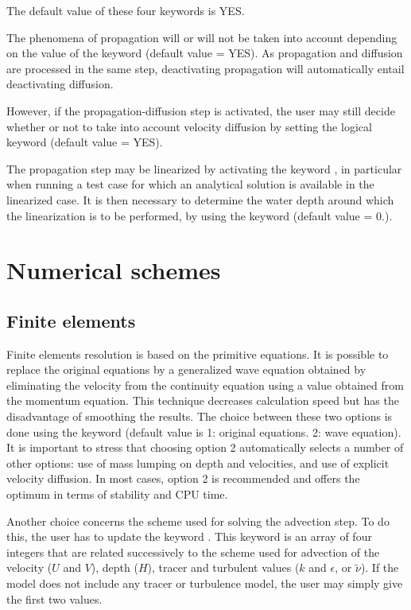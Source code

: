 The default value of these four keywords is YES.

The phenomena of propagation will or will not be taken into account depending
on the value of the keyword  (default value = YES).
As propagation and diffusion are processed in the same step,
deactivating propagation will automatically entail deactivating diffusion.

However, if the propagation-diffusion step is activated, the user may still
decide whether or not to take into account velocity diffusion by setting
the logical keyword  (default value = YES).

The propagation step may be linearized by activating the keyword
, in particular when running a test case
for which an analytical solution is available in the linearized case.
It is then necessary to determine the water depth around which the
linearization is to be performed, by using the keyword
 (default value = 0.).


\section{Numerical schemes}

\subsection{Finite elements}
Finite elements resolution is based on the primitive equations.
It is possible to replace the original equations by a generalized wave equation
obtained by eliminating the velocity from the continuity equation using a value
obtained from the momentum equation.
This technique decreases calculation speed but has the disadvantage
of smoothing the results.
The choice between these two options is done using the keyword
(default value is 1: original equations. 2: wave equation).
It is important to stress that choosing option 2 automatically selects
a number of other options:
use of mass lumping on depth and velocities, and use of explicit velocity
diffusion.
In most cases, option 2 is recommended and offers the optimum in terms of
stability and CPU time.

Another choice concerns the scheme used for solving the advection step.
To do this, the user has to update the keyword .
This keyword is an array of four integers that are related successively
to the scheme used for advection of the velocity ($U$ and $V$), depth ($H$),
tracer and turbulent values ($k$ and $\epsilon$, or $\tilde{\nu}$).
If the model does not include any tracer or turbulence model,
the user may simply give the first two values.

